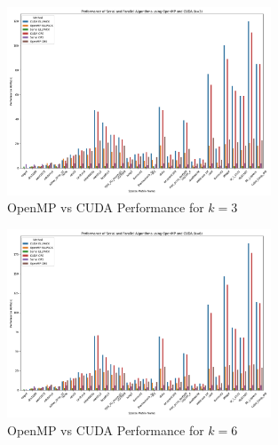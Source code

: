 \documentclass[12pt,oneside]{book} %
\begin{document}
\begin{figure}[H]
    \centering
    \includegraphics[width=0.7\textwidth]{../results/images/OpenMP_vs_CUDA_Performance_k3.png}
    \caption{OpenMP vs CUDA Performance for $k=3$}
    \label{fig:openmp-cuda-performance-k3}
\end{figure}

\begin{figure}[H]
    \centering
    \includegraphics[width=0.7\textwidth]{../results/images/OpenMP_vs_CUDA_Performance_k6.png}
    \caption{OpenMP vs CUDA Performance for $k=6$}
    \label{fig:openmp-cuda-performance-k6}
\end{figure}
\end{document}
